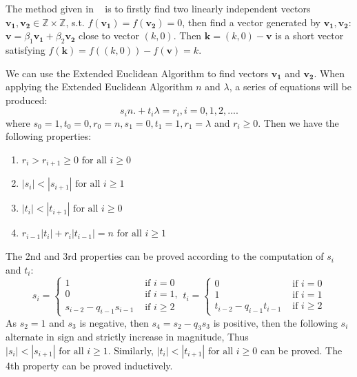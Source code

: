 \documentclass{article}
\newcommand{\Z}{\mathbb{Z}}
\begin{document}
The method given in ~\cite{glv01} is to firstly find two linearly independent vectors $\mathbf{v_1}, \mathbf{v_2} \in \Z \times \Z$,
s.t. $f(\mathbf{v_1}) = f(\mathbf{v_2}) = 0$, then find a vector  generated by $\mathbf{v_1}, \mathbf{v_2}$: 
$\mathbf{v} = \beta_1\mathbf{v_1} + \beta_2\mathbf{v_2}$  close to vector $(k,0)$. 
Then $\mathbf{k} = (k,0) - \mathbf{v}$ is a short vector satisfying $f(\mathbf{k}) = f((k,0)) - f(\mathbf{v}) = k$.

We can use the Extended Euclidean Algorithm to find vectors $\mathbf{v_1}$ and $\mathbf{v_2}$.
When applying the Extended Euclidean Algorithm $n$ and $\lambda$,
a series of equations will be produced:
\begin{equation}
\label{eq-eea}
s_i n. + t_i \lambda = r_i, i = 0, 1, 2, ....
\end{equation}
where $s_0 = 1, t_0 = 0, r_0 = n, s_1 =0, t_1 = 1, r_1 = \lambda$ and $r_i \ge 0$.
Then we have the following properties:
\begin{enumerate}
\item $r_i > r_{i+1} \ge 0 \text{ for all } i \ge 0$
\item $|s_i| < |s_{i+1}| \text{ for all } i \ge 1$
\item $|t_i| < |t_{i+1}| \text{ for all } i \ge 0$
\item $r_{i-1}|t_i| + r_i|t_{i-1}| = n \text{ for all } i \ge 1$
\end{enumerate}
The 2nd and 3rd properties can be  proved according to the computation of $s_i$ and $t_i$:
\begin{equation}\nonumber
s_i = \left\{
\begin{array}{ll}
1 & \text{ if } i = 0 \\
0 & \text{ if } i = 1, \\
s_{i-2} - q_{i-1}s_{i-1} & \text{ if } i \ge 2 
\end{array}
\right. 
t_i = \left\{
\begin{array}{ll}
0 & \text{ if } i = 0 \\
1 & \text{ if } i = 1 \\
t_{i-2} - q_{i-1}t_{i-1} & \text{ if } i \ge 2 
\end{array}
\right.
\end{equation}
As $s_2 = 1$ and $s_3$ is negative, then $s_4 = s_2 - q_3s_3$ is positive, 
then the following  $s_{i}$ alternate in sign and strictly increase in magnitude, 
Thus $|s_i| < |s_{i+1}| \text{ for all } i \ge 1$.
Similarly, $|t_i| < |t_{i+1}| \text{ for all } i \ge 0$ can be proved.
The 4th property can be proved inductively.
\end{document}
